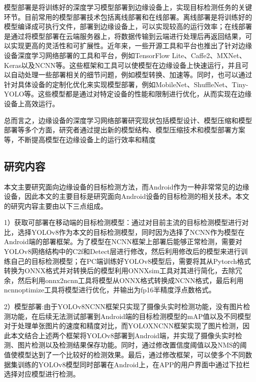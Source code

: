 \documentclass{ctexart}
\numberwithin{equation}{section}%
\numberwithin{figure}{section}%
\numberwithin{table}{section}%
\begin{document}
	模型部署是将训练好的深度学习模型部署到边缘设备上，实现目标检测任务的关键环节。目前常用的模型部署技术包括离线部署和在线部署。离线部署是将训练好的模型编译成可执行文件，部署到边缘设备上，可以实现较高的运行效率；在线部署是通过将模型部署在云端服务器上，将数据传输到云端进行处理后再返回结果，可以实现更高的灵活性和可扩展性。近年来，一些开源工具和平台也推出了针对边缘设备深度学习网络部署的工具和平台，例如TensorFlow Lite、Caffe2、MXNet、Keras以及NCNN\textsuperscript{\cite{15}}等。这些框架和工具可以使模型在边缘设备上快速运行，并且可以自动处理一些部署相关的细节问题，例如模型转换、加速等。同时，也可以通过针对具体设备的定制化优化来实现模型部署，例如MobileNet\textsuperscript{\cite{16}}、ShuffleNet\textsuperscript{\cite{17}}、Tiny-YOLO\textsuperscript{\cite{18}}等。这些模型都是通过对特定设备的性能和限制进行优化，从而实现在边缘设备上高效运行。
	
	总而言之，边缘设备的深度学习网络部署研究现状包括模型设计、模型压缩和模型部署等多个方面，研究者通过提出新的模型结构、模型压缩技术和模型部署方案等，不断提高模型在边缘设备上的运行效率和精度
	
	\subsection{研究内容}
	
	本文主要研究面向边缘设备的目标检测方法，而Android作为一种非常常见的边缘设备，因此本文的主要目标是研究面向Android设备的目标检测的相关技术。本文的研究内容主要由以下三点组成。
	
	1）获取可部署在移动端的目标检测模型：通过对目前主流的目标检测模型进行对比，选择YOLOv8作为本文的目标检测模型，同时因为选择了NCNN作为模型在Android端的部署框架。为了模型在NCNN框架上部署后能够正常检测，需要对YOLOv8网络结构中的C2f和Detect层进行修改，然后利用修改后的模型来进行训练自己的目标检测模型；在PC端训练好YOLOv8模型后，需要将其从Pytorch格式转换为ONNX格式并对转换后的模型利用ONNXsim工具对其进行简化，去除冗余，然后利用onnx2ncnn工具将模型从ONNX格式转换成NCNN格式，最后利用ncnnoptimize工具将模型进行优化，并输出为fp16半精度浮点数格式。
	
	2）模型部署:由于YOLOv8NCNN框架只实现了摄像头实时检测功能，没有图片检测功能，在后续无法测试部署到Android端的目标检测模型的mAP值以及不同模型对于处理单张图片的速度和精度对比，而YOLOXNCNN框架实现了图片检测，因此本文结合上述两个框架将YOLOv8部署到Android端，并实现了摄像头实时检测、图片检测以及检测结果保存功能。同时，通过修改置信度阈值以及NMS的阈值使模型达到了一个比较好的检测效果。最后，通过修改框架，可以使多个不同数据集训练的YOLOv8模型同时部署在Android上，在APP的用户界面中通过下拉栏选择对应模型进行检测。
	
\end{document}
